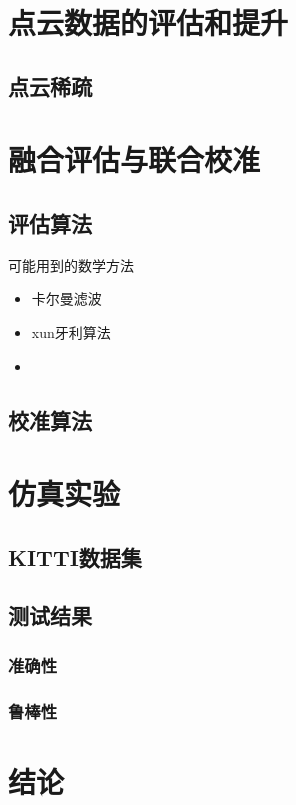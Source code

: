 \documentclass{amsart}
\begin{document}
\section{点云数据的评估和提升}
\subsection{点云稀疏}
\section{融合评估与联合校准}
\subsection{评估算法}
可能用到的数学方法
\begin{itemize}
\item 卡尔曼滤波
\item xun牙利算法
\item 
\end{itemize}
\subsection{校准算法}

\section{仿真实验}
\subsection{KITTI数据集}

\subsection{测试结果}
\subsubsection{准确性}
\label{sec:0601}

\subsubsection{鲁棒性}
\section{结论}
\end{document}
